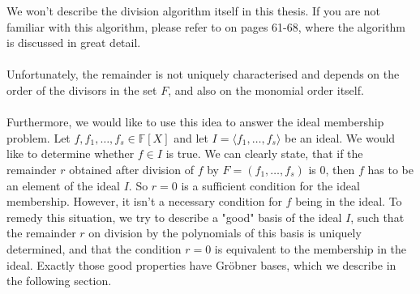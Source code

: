 \documentclass[thesis=M,english]{FITthesis}[2012/10/20]
\theoremstyle{remark}
\theoremstyle{definition}
\begin{document}
\noindent We won't describe the division algorithm itself in this thesis. If you are not familiar with this algorithm, please refer to \cite{algGeom} on pages 61-68, where the algorithm is discussed in great detail.\\ \\
\noindent Unfortunately, the remainder is not uniquely characterised and depends on the order of the divisors in the set $F$, and also on the monomial order itself. \\ \\
\noindent Furthermore, we would like to use this idea to answer the ideal membership problem. Let $f, f_1, \ldots, f_s \in \mathbb{F}[X]$ and let $I = \langle f_1, \ldots, f_s \rangle$ be an ideal. We would like to determine whether $f \in I$ is true. We can clearly state, that if the remainder $r$ obtained after division of $f$ by $F = (f_1, \ldots, f_s)$ is $0$, then $f$ has to be an element of the ideal $I$. So $r=0$ is a sufficient condition for the ideal membership. However, it isn't a necessary condition for $f$ being in the ideal. To remedy this situation, we try to describe a "good" basis of the ideal $I$, such that the remainder $r$ on division by the polynomials of this basis is uniquely determined, and that the condition $r=0$ is equivalent to the membership in the ideal. Exactly those good properties have Gröbner bases, which we describe in the following section.
\end{document}
